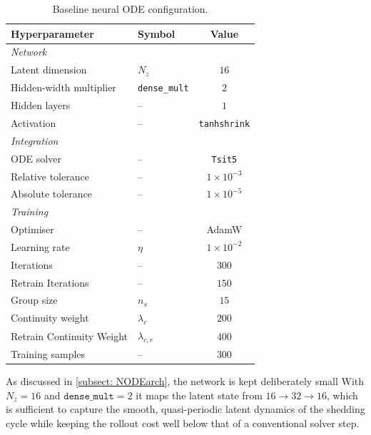\begin{table}[H]
    \centering
    \begin{tabular}{@{}llc@{}}
        \toprule
        Hyperparameter & Symbol & Value \\
        \midrule
        \multicolumn{3}{l}{\textit{Network}} \\
        Latent dimension          & $N_z$                & $16$ \\
        Hidden-width multiplier   & \texttt{dense\_mult} & $2$  \\ %
        Hidden layers             & --                   & $1$  \\
        Activation                & --                   & \texttt{tanhshrink} \\
        \midrule
        \multicolumn{3}{l}{\textit{Integration}} \\
        ODE solver                & --                   & \texttt{Tsit5} \\
        Relative tolerance        & --                   & $1\times10^{-3}$ \\
        Absolute tolerance        & --                   & $1\times10^{-5}$ \\
        \midrule
        \multicolumn{3}{l}{\textit{Training}} \\
        Optimiser                 & --                   & AdamW \\
        Learning rate             & $\eta$               & $1\times10^{-2}$ \\
        Iterations                & --                   & $300$ \\
        Retrain Iterations        & --                   & $150$ \\
        Group size                & $n_s$                & $15$  \\
        Continuity weight         & $\lambda_c$          & $200$ \\
        Retrain Continuity Weight & $\lambda_{c, r}$     & $400$ \\
        Training samples          & --                   & $300$ \\
        \bottomrule
    \end{tabular}
    \caption{Baseline neural ODE configuration.}
    \label{tab: 4_node_config}
\end{table}

As discussed in \autoref{subsect: NODEarch}, the network is kept deliberately small With $N_z = 16$ and $\texttt{dense\_mult}=2$ it maps the latent state from $16 \to 32 \to 16$, which is sufficient to capture the smooth, quasi-periodic latent dynamics of the shedding cycle while keeping the rollout cost well below that of a conventional solver step. 

